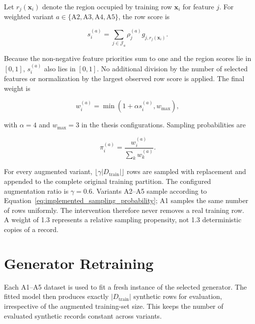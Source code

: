 Let $r_j(\mathbf{x}_i)$ denote the region occupied by training row
$\mathbf{x}_i$ for feature $j$. For weighted variant $a\in\{\mathrm{A2},
\mathrm{A3},\mathrm{A4},\mathrm{A5}\}$, the row score is

\begin{equation}
    s_i^{(a)} = \sum_{j\in\mathcal{J}_a}
        \rho_j^{(a)}g_{j,r_j(\mathbf{x}_i)}.
    \label{eq:implemented_row_score}
\end{equation}

Because the non-negative feature priorities sum to one and the region scores
lie in $[0,1]$, $s_i^{(a)}$ also lies in $[0,1]$. No additional division by
the number of selected features or normalization by the largest observed row
score is applied. The final weight is

\begin{equation}
    w_i^{(a)} = \min\left(1+\alpha s_i^{(a)},w_{\max}\right),
    \label{eq:implemented_row_weight}
\end{equation}

with $\alpha=4$ and $w_{\max}=3$ in the thesis configurations. Sampling
probabilities are

\begin{equation}
    \pi_i^{(a)} = \frac{w_i^{(a)}}{\sum_k w_k^{(a)}}.
    \label{eq:implemented_sampling_probability}
\end{equation}

For every augmented variant, $\lfloor\gamma|D_{\mathrm{train}}|\rfloor$
rows are sampled with replacement and appended to the complete original
training partition. The configured augmentation ratio is $\gamma=0.6$.
Variants A2--A5 sample according to Equation~\ref{eq:implemented_sampling_probability};
A1 samples the same number of rows uniformly. The intervention therefore
never removes a real training row. A weight of 1.3 represents a relative
sampling propensity, not 1.3 deterministic copies of a record.

\section{Generator Retraining}
\label{sec:generator_retraining}

Each A1--A5 dataset is used to fit a fresh instance of the selected generator.
The fitted model then produces exactly $|D_{\mathrm{train}}|$ synthetic rows
for evaluation, irrespective of the augmented training-set size. This keeps
the number of evaluated synthetic records constant across variants.

